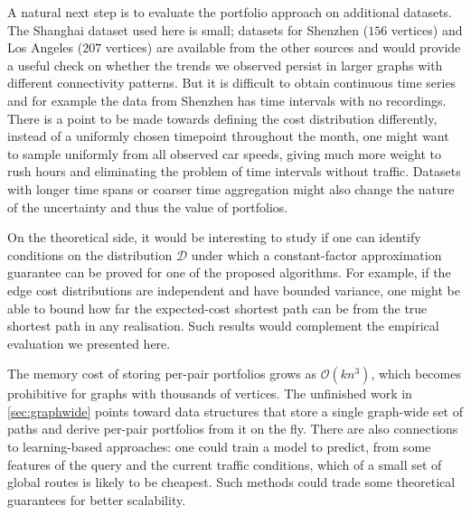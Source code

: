 A natural next step is to evaluate the portfolio approach on additional datasets. The Shanghai dataset used here is small; datasets for Shenzhen ($156$ vertices) and Los Angeles ($207$ vertices) are available from the other sources and would provide a useful check on whether the trends we observed persist in larger graphs with different connectivity patterns. But it is difficult to obtain continuous time series and for example the data from Shenzhen has time intervals with no recordings. There is a point to be made towards defining the cost distribution differently, instead of a uniformly chosen timepoint throughout the month, one might want to sample uniformly from all observed car speeds, giving much more weight to rush hours and eliminating the problem of time intervals without traffic. Datasets with longer time spans or coarser time aggregation might also change the nature of the uncertainty and thus the value of portfolios.

On the theoretical side, it would be interesting to study if one can identify conditions on the distribution $\mathcal D$ under which a constant-factor approximation guarantee can be proved for one of the proposed algorithms. For example, if the edge cost distributions are independent and have bounded variance, one might be able to bound how far the expected-cost shortest path can be from the true shortest path in any realisation. Such results would complement the empirical evaluation we presented here.

The memory cost of storing per-pair portfolios grows as $\mathcal O(k n^3)$, which becomes prohibitive for graphs with thousands of vertices. The unfinished work in \cref{sec:graphwide} points toward data structures that store a single graph-wide set of paths and derive per-pair portfolios from it on the fly. There are also connections to learning-based approaches: one could train a model to predict, from some features of the query and the current traffic conditions, which of a small set of global routes is likely to be cheapest. Such methods could trade some theoretical guarantees for better scalability.
